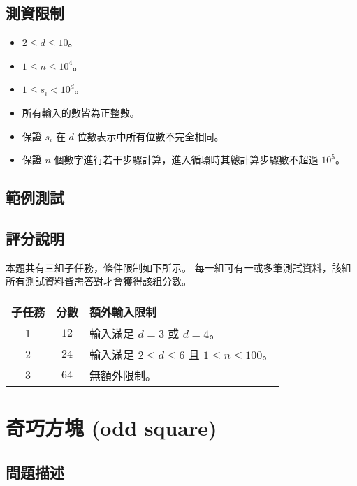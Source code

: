 \subsection{測資限制}

\begin{itemize}
\tightlist
\item
  \(2 \le d \le 10\)。
\item
  \(1 \le n \le 10^4\)。
\item
  \(1 \le s_i < 10^d\)。
\item
  所有輸入的數皆為正整數。
\item
  保證 \(s_i\) 在 \(d\) 位數表示中所有位數不完全相同。
\item
  保證 \(n\) 個數字進行若干步驟計算，進入循環時其總計算步驟數不超過
  \(10^5\)。
\end{itemize}

\subsection{範例測試}

\begin{example}
%
%
\end{example}

\subsection{評分說明}

本題共有三組子任務，條件限制如下所示。
每一組可有一或多筆測試資料，該組所有測試資料皆需答對才會獲得該組分數。

\begin{longtable}[]{@{}ccl@{}}
\toprule
子任務 & 分數 & 額外輸入限制 \\
\midrule
\endhead
1 & \(12\) & 輸入滿足 \(d = 3\) 或 \(d = 4\)。 \\
2 & \(24\) & 輸入滿足 \(2 \le d \le 6\) 且 \(1 \le n \le 100\)。 \\
3 & \(64\) & 無額外限制。 \\
\bottomrule
\end{longtable}

\section{奇巧方塊 (odd square)}

\subsection{問題描述}

